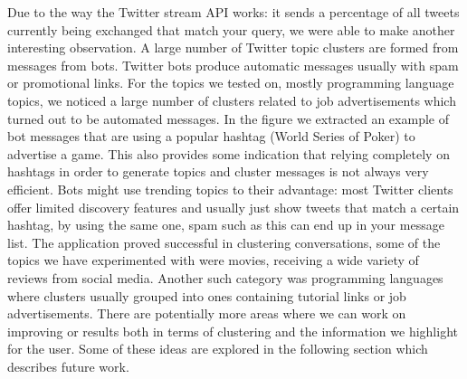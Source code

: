 \newline
Due to the way the Twitter stream API works: it sends a percentage of all tweets currently being exchanged that match your query, we were able to make another interesting observation. A large number of Twitter topic clusters are formed from messages from bots. Twitter bots produce automatic messages usually with spam or promotional links. For the topics we tested on, mostly programming language topics, we noticed a large number of clusters related to job advertisements which turned out to be automated messages.
In the figure we extracted an example of bot messages that are using a popular hashtag (World Series of Poker) to advertise a game. This also provides some indication that relying completely on hashtags in order to generate topics and cluster messages is not always very efficient. Bots might use trending topics to their advantage: most Twitter clients offer limited discovery features and usually just show tweets that match a certain hashtag, by using the same one, spam such as this can end up in your message list.
\newline
The application proved successful in clustering conversations, some of the topics we have experimented with were movies, receiving a wide variety of reviews from social media. Another such category was programming languages where clusters usually grouped into ones containing tutorial links or job advertisements.
\newline
There are potentially more areas where we can work on improving or results both in terms of clustering and the information we highlight for the user. Some of these ideas are explored in the following section which describes future work.